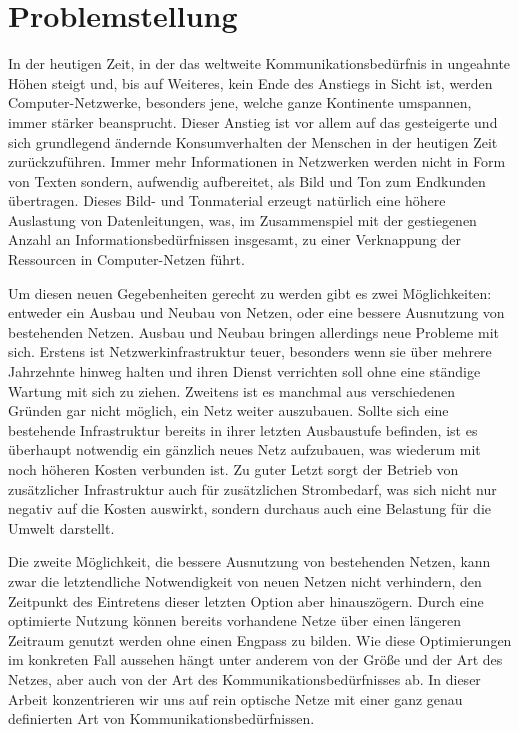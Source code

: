 \chapter{Problemstellung}
In der heutigen Zeit, in der das weltweite Kommunikationsbedürfnis in ungeahnte Höhen steigt und, bis auf Weiteres, kein Ende des Anstiegs in Sicht ist, werden Computer-Netzwerke, besonders jene, welche ganze Kontinente umspannen, immer stärker beansprucht. Dieser Anstieg ist vor allem auf das gesteigerte und sich grundlegend ändernde Konsumverhalten der Menschen in der heutigen Zeit zurückzuführen. Immer mehr Informationen in Netzwerken werden nicht in Form von Texten sondern, aufwendig aufbereitet, als Bild und Ton zum Endkunden übertragen. Dieses Bild- und Tonmaterial erzeugt natürlich eine höhere Auslastung von Datenleitungen, was, im Zusammenspiel mit der gestiegenen Anzahl an Informationsbedürfnissen insgesamt, zu einer Verknappung der Ressourcen in Computer-Netzen führt.

Um diesen neuen Gegebenheiten gerecht zu werden gibt es zwei Möglichkeiten: entweder ein Ausbau und Neubau von Netzen, oder eine bessere Ausnutzung von bestehenden Netzen. Ausbau und Neubau bringen allerdings neue Probleme mit sich. Erstens ist Netzwerkinfrastruktur teuer, besonders wenn sie über mehrere Jahrzehnte hinweg halten und ihren Dienst verrichten soll ohne eine ständige Wartung mit sich zu ziehen. Zweitens ist es manchmal aus verschiedenen Gründen gar nicht möglich, ein Netz weiter auszubauen. Sollte sich eine bestehende Infrastruktur bereits in ihrer letzten Ausbaustufe befinden, ist es überhaupt notwendig ein gänzlich neues Netz aufzubauen, was wiederum mit noch höheren Kosten verbunden ist. Zu guter Letzt sorgt der Betrieb von zusätzlicher Infrastruktur auch für zusätzlichen Strombedarf, was sich nicht nur negativ auf die Kosten auswirkt, sondern durchaus auch eine Belastung für die Umwelt darstellt.

Die zweite Möglichkeit, die bessere Ausnutzung von bestehenden Netzen, kann zwar die letzt\-endliche Notwendigkeit von neuen Netzen nicht verhindern, den Zeitpunkt des Eintretens dieser letzten Option aber hinauszögern. Durch eine optimierte Nutzung können bereits vorhandene Netze über einen längeren Zeitraum genutzt werden ohne einen Engpass zu bilden. Wie diese Optimierungen im konkreten Fall aussehen hängt unter anderem von der Größe und der Art des Netzes, aber auch von der Art des Kommunikationsbedürfnisses ab. In dieser Arbeit konzentrieren wir uns auf rein optische Netze mit einer ganz genau definierten Art von Kommunikationsbedürfnissen.

